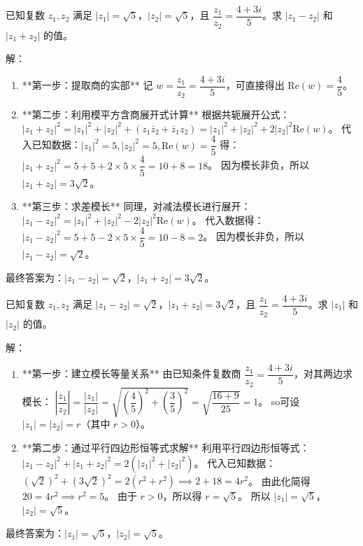 \documentclass{exam-zh}
\newcounter{solstep}
\begin{document}
\begin{problem}[points=15]
  已知复数 $z_1, z_2$ 满足 $|z_1| = \sqrt{5}$，$|z_2| = \sqrt{5}$，且 $\dfrac{z_1}{z_2} = \dfrac{4+3i}{5}$。求 $|z_1 - z_2|$ 和 $|z_1 + z_2|$ 的值。
  \setcounter{solstep}{0}
  \begin{solutionblock}
    解：
\begin{enumerate}
  \item **第一步：提取商的实部**
  记 $w = \dfrac{z_1}{z_2} = \dfrac{4+3i}{5}$，可直接得出 $\mathrm{Re}(w) = \dfrac{4}{5}$。
  
  \item **第二步：利用模平方含商展开式计算**
  根据共轭展开公式：
  $|z_1 + z_2|^2 = |z_1|^2 + |z_2|^2 + (z_1\bar{z}_2 + \bar{z}_1z_2) = |z_1|^2 + |z_2|^2 + 2|z_2|^2 \mathrm{Re}(w)$。
  代入已知数据：$|z_1|^2 = 5, |z_2|^2 = 5, \mathrm{Re}(w) = \dfrac{4}{5}$ 得：
  $|z_1 + z_2|^2 = 5 + 5 + 2 \times 5 \times \dfrac{4}{5} = 10 + 8 = 18$。
  因为模长非负，所以 $|z_1 + z_2| = 3\sqrt{2}$。
  
  \item **第三步：求差模长**
  同理，对减法模长进行展开：
  $|z_1 - z_2|^2 = |z_1|^2 + |z_2|^2 - 2|z_2|^2 \mathrm{Re}(w)$。
  代入数据得：
  $|z_1 - z_2|^2 = 5 + 5 - 2 \times 5 \times \dfrac{4}{5} = 10 - 8 = 2$。
  因为模长非负，所以 $|z_1 - z_2| = \sqrt{2}$。
\end{enumerate}
最终答案为：$|z_1 - z_2| = \sqrt{2}$，$|z_1 + z_2| = 3\sqrt{2}$。
  \end{solutionblock}
\end{problem}



\begin{problem}[points=15]
  已知复数 $z_1, z_2$ 满足 $|z_1 - z_2| = \sqrt{2}$，$|z_1 + z_2| = 3\sqrt{2}$，且 $\dfrac{z_1}{z_2} = \dfrac{4+3i}{5}$。求 $|z_1|$ 和 $|z_2|$ 的值。
  \setcounter{solstep}{0}
  \begin{solutionblock}
    解：
\begin{enumerate}
  \item **第一步：建立模长等量关系**
  由已知条件复数商 $\dfrac{z_1}{z_2} = \dfrac{4+3i}{5}$，对其两边求模长：
  $\left|\dfrac{z_1}{z_2}\right| = \dfrac{|z_1|}{|z_2|} = \sqrt{\left(\dfrac{4}{5}\right)^2 + \left(\dfrac{3}{5}\right)^2} = \sqrt{\dfrac{16+9}{25}} = 1$。
  so可设 $|z_1| = |z_2| = r$（其中 $r > 0$）。
  
  \item **第二步：通过平行四边形恒等式求解**
  利用平行四边形恒等式：$|z_1 - z_2|^2 + |z_1 + z_2|^2 = 2(|z_1|^2 + |z_2|^2)$。
  代入已知数据：$(\sqrt{2})^2 + (3\sqrt{2})^2 = 2(r^2 + r^2) \implies 2 + 18 = 4r^2$。
  由此化简得 $20 = 4r^2 \implies r^2 = 5$。
  由于 $r > 0$，所以得 $r = \sqrt{5}$。
  所以 $|z_1| = \sqrt{5}$，$|z_2| = \sqrt{5}$。
\end{enumerate}
最终答案为：$|z_1| = \sqrt{5}$，$|z_2| = \sqrt{5}$。
  \end{solutionblock}
\end{problem}
\end{document}

